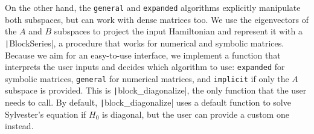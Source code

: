 On the other hand, the \texttt{general} and \texttt{expanded} algorithms explicitly
manipulate both subspaces, but can work with dense matrices too.
We use the eigenvectors of the $A$ and $B$ subspaces to project the input
Hamiltonian and represent it with a \texttt|BlockSeries|, a procedure that works for
numerical and symbolic matrices.
Because we aim for an easy-to-use interface, we implement a function that
interprets the user inputs and decides which algorithm to use: \texttt{expanded}
for symbolic matrices, \texttt{general} for numerical matrices, and \texttt{implicit} if
only the $A$ subspace is provided.
This is \texttt|block\_diagonalize|, the only function that the user needs to call.
By default, \texttt|block\_diagonalize| uses a default function to solve Sylvester's
equation if $H_0$ is diagonal, but the user can provide a custom one instead.
